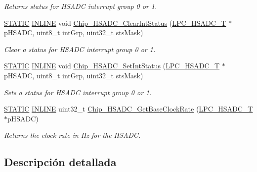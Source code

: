 \begin{DoxyCompactItemize}
\begin{DoxyCompactList}\small\item\em Returns status for H\+S\+A\+DC interrupt group 0 or 1. \end{DoxyCompactList}\item 
\hyperlink{group___l_p_c___types___public___macros_ga10b2d890d871e1489bb02b7e70d9bdfb}{S\+T\+A\+T\+IC} \hyperlink{spifi__18xx__43xx_8h_a2eb6f9e0395b47b8d5e3eeae4fe0c116}{I\+N\+L\+I\+NE} void \hyperlink{group___h_s_a_d_c__18_x_x__43_x_x_gae82a73631a4bfab5393ba6468b4624f0}{Chip\+\_\+\+H\+S\+A\+D\+C\+\_\+\+Clear\+Int\+Status} (\hyperlink{struct_l_p_c___h_s_a_d_c___t}{L\+P\+C\+\_\+\+H\+S\+A\+D\+C\+\_\+T} $\ast$p\+H\+S\+A\+DC, uint8\+\_\+t int\+Grp, uint32\+\_\+t sts\+Mask)
\begin{DoxyCompactList}\small\item\em Clear a status for H\+S\+A\+DC interrupt group 0 or 1. \end{DoxyCompactList}\item 
\hyperlink{group___l_p_c___types___public___macros_ga10b2d890d871e1489bb02b7e70d9bdfb}{S\+T\+A\+T\+IC} \hyperlink{spifi__18xx__43xx_8h_a2eb6f9e0395b47b8d5e3eeae4fe0c116}{I\+N\+L\+I\+NE} void \hyperlink{group___h_s_a_d_c__18_x_x__43_x_x_ga4594b318a86bb5a6532fbba4f8f70b2f}{Chip\+\_\+\+H\+S\+A\+D\+C\+\_\+\+Set\+Int\+Status} (\hyperlink{struct_l_p_c___h_s_a_d_c___t}{L\+P\+C\+\_\+\+H\+S\+A\+D\+C\+\_\+T} $\ast$p\+H\+S\+A\+DC, uint8\+\_\+t int\+Grp, uint32\+\_\+t sts\+Mask)
\begin{DoxyCompactList}\small\item\em Sets a status for H\+S\+A\+DC interrupt group 0 or 1. \end{DoxyCompactList}\item 
\hyperlink{group___l_p_c___types___public___macros_ga10b2d890d871e1489bb02b7e70d9bdfb}{S\+T\+A\+T\+IC} \hyperlink{spifi__18xx__43xx_8h_a2eb6f9e0395b47b8d5e3eeae4fe0c116}{I\+N\+L\+I\+NE} uint32\+\_\+t \hyperlink{group___h_s_a_d_c__18_x_x__43_x_x_gae05840f7109ac514c0a6c696013c0b4c}{Chip\+\_\+\+H\+S\+A\+D\+C\+\_\+\+Get\+Base\+Clock\+Rate} (\hyperlink{struct_l_p_c___h_s_a_d_c___t}{L\+P\+C\+\_\+\+H\+S\+A\+D\+C\+\_\+T} $\ast$p\+H\+S\+A\+DC)
\begin{DoxyCompactList}\small\item\em Returns the clock rate in Hz for the H\+S\+A\+DC. \end{DoxyCompactList}\end{DoxyCompactItemize}


\subsection{Descripción detallada}


